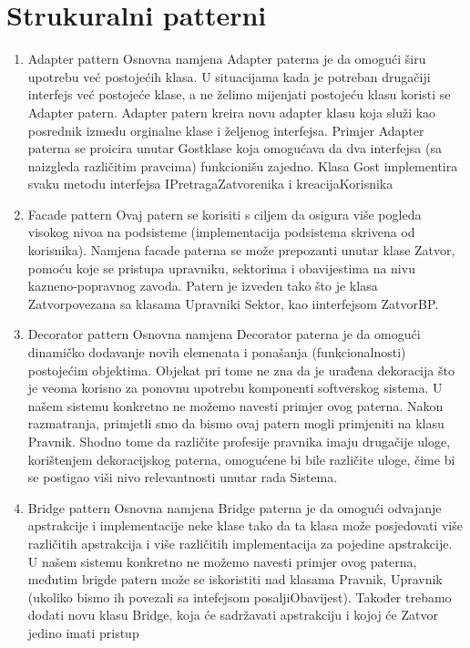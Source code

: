 \documentclass[12pt, a4paper]{report}
\theoremstyle{definition}
\begin{document}
\section *{Strukuralni patterni}
\begin{enumerate}

  \item  \large Adapter pattern \newline
  \normalsize
  Osnovna  namjena  Adapter  paterna  je  da omogući  širu  upotrebu  već postojećih  klasa.  U situacijama kada je potreban drugačiji interfejs već postojeće klase, a ne želimo mijenjati postojeću klasu koristi se Adapter patern. Adapter patern kreira novu adapter klasu koja služi kao posrednik izmedu orginalne klase i željenog interfejsa. Primjer Adapter paterna se proicira unutar Gostklase  koja  omogućava  da  dva  interfejsa  (sa  naizgleda  različitim  pravcima) funkcionišu zajedno. Klasa Gost implementira svaku metodu interfejsa IPretragaZatvorenika i kreacijaKorisnika
  \item \large Facade pattern \newline
  \normalsize
  Ovaj  patern  se  korisiti  s  ciljem  da  osigura  više  pogleda  visokog  nivoa  na  podsisteme (implementacija   podsistema   skrivena   od korisnika).   Namjena   facade  paterna  se  može prepozanti unutar klase Zatvor, pomoću koje se pristupa upravniku, sektorima i obavijestima na  nivu  kazneno-popravnog zavoda. Patern je izveden tako što je klasa Zatvorpovezana  sa klasama Upravniki Sektor, kao iinterfejsom ZatvorBP. 
   \item \large Decorator pattern \newline
  \normalsize
  Osnovna namjena Decorator paterna je da omogući dinamičko dodavanje novih elemenata i ponašanja (funkcionalnosti) postojećim objektima. Objekat pri tome ne zna da je urađena dekoracija što je veoma korisno za ponovnu upotrebu komponenti softverskog sistema.  U našem  sistemu  konkretno  ne  možemo  navesti  primjer  ovog  paterna.  Nakon  razmatranja, primjetli smo da bismo ovaj patern mogli primjeniti na klasu Pravnik. Shodno tome da  različite profesije pravnika imaju drugačije uloge, korištenjem dekoracijskog paterna,  omogućene bi bile različite uloge, čime bi se postigao viši nivo relevantnosti unutar rada Sistema. 
    \item \large Bridge pattern \newline
  \normalsize
  Osnovna namjena Bridge paterna je da omogući odvajanje apstrakcije i implementacije neke klase  tako  da  ta  klasa  može  posjedovati  više  različitih  apstrakcija  i  više  različitih implementacija  za  pojedine  apstrakcije.  U  našem  sistemu  konkretno  ne  možemo  navesti primjer  ovog  paterna,  međutim  brigde  patern  može  se  iskoristiti  nad  klasama Pravnik, Upravnik (ukoliko bismo ih povezali sa intefejsom posaljiObavijest). Također trebamo dodati novu klasu Bridge, koja će sadržavati apstrakciju i kojoj će Zatvor jedino imati pristup

\end{enumerate}
\end{document}
